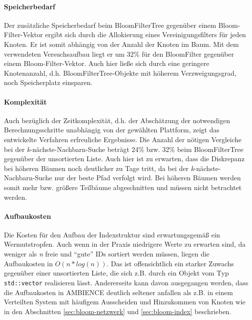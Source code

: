 \paragraph*{Speicherbedarf}
Der zusätzliche Speicherbedarf beim BloomFilterTree gegenüber einem Bloom-Filter-Vektor ergibt sich durch die Allokierung eines Vereinigungsfilters für jeden Knoten. Er ist somit abhängig von der Anzahl der Knoten im Baum. Mit dem verwendeten Versuchsaufbau liegt er um 32\% für den BloomFilter gegenüber einem Bloom-Filter-Vektor. Auch hier ließe sich durch eine geringere Knotenanzahl, d.h. BloomFilterTree-Objekte mit höherem Verzweigungsgrad, noch Speicherplatz einsparen. 
\paragraph*{Komplexität}
Auch bezüglich der Zeitkomplexität, d.h. der Abschätzung der notwendigen Berechnungsschritte unabhängig von der gewählten Plattform, zeigt das entwickelte Verfahren erfreuliche Ergebnisse. Die Anzahl der nötigen Vergleiche bei der \textit{k}-nächste-Nachbarn-Suche beträgt 24\% bzw. 32\% beim BloomFilterTree gegenüber der unsortierten Liste. Auch hier ist zu erwarten, dass die Diskrepanz bei höheren Bäumen noch deutlicher zu Tage tritt, da bei der \textit{k}-nächste-Nachbarn-Suche nur der beste Pfad verfolgt wird. Bei höheren Bäumen werden somit mehr bzw. größere Teilbäume abgeschnitten und müssen nicht betrachtet werden. 
\paragraph*{Aufbaukosten}
Die Kosten für den Aufbau der Indexstruktur sind erwartungsgemäß ein Wermutstropfen. Auch wenn in der Praxis niedrigere Werte zu erwarten sind, da weniger als \textit{n} freie und "`gute"' IDs sortiert werden müssen, liegen die Aufbaukosten in $O(n\ast log(n))$. Das ist offensichtlich ein starker Zuwachs gegenüber einer unsortierten Liste, die sich z.B. durch ein Objekt vom Typ \texttt{std::vector} realisieren lässt. Andererseits kann davon ausgegangen werden, dass die Aufbaukosten in AMBIENCE deutlich seltener anfallen als z.B. in einem Verteilten System mit häufigem Ausscheiden und Hinzukommen von Knoten wie in den Abschnitten \ref{sec:bloom-netzwerk} und \ref{sec:bloom-index} beschrieben.